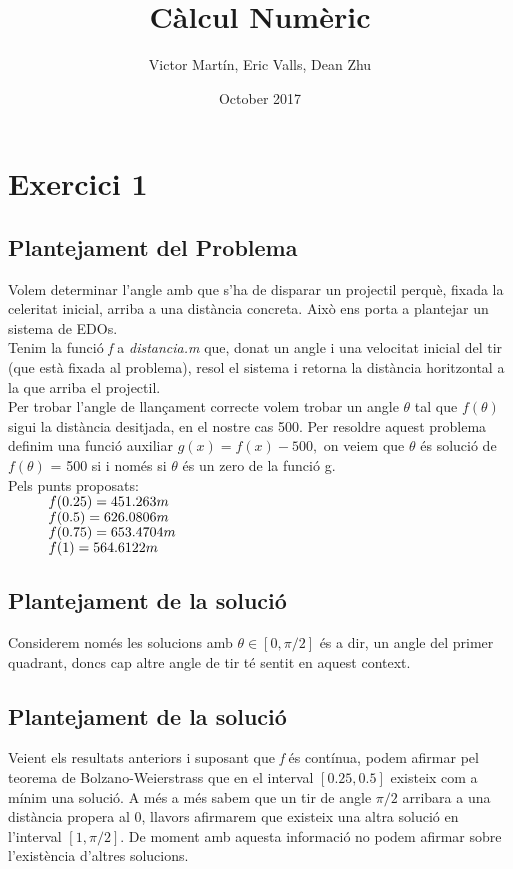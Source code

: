 \documentclass{article}
\title{C\`alcul Num\`eric}
\author{Victor Mart\'in, Eric Valls, Dean Zhu}
\date{October 2017}
\begin{document}
\maketitle
\section*{Exercici 1}
\subsection*{Plantejament del Problema}
\quad Volem determinar l'angle amb que s'ha de disparar un projectil perquè, fixada la celeritat inicial, arriba a una dist\`ancia concreta. Aix\`o ens porta a plantejar un sistema de EDOs. \\

Tenim la funci\'o \emph{f} a \emph{distancia.m}
que, donat un angle i una velocitat inicial del tir (que està fixada al problema), resol el sistema i retorna la dist\`ancia horitzontal a la que arriba el projectil. \\

Per trobar l'angle de llan\c{c}ament correcte volem trobar un angle ${\theta}$ tal que $f({\theta})$ sigui la dist\`ancia desitjada, en el nostre cas 500. Per resoldre aquest problema definim una funci\'o auxiliar $g(x) = f(x) - 500,$ on veiem que ${\theta}$ \'es soluci\'o de $f({\theta})$ = 500 si i només si  ${\theta}$  és un zero de la funci\'o g.\\

Pels punts proposats:\\
$\hspace*{1cm} f(0.25) = 451.263 m$\\
$\hspace*{1cm} f(0.5) = 626.0806 m$\\
$\hspace*{1cm} f(0.75) = 653.4704 m$\\
$\hspace*{1cm} f(1) = 564.6122 m$
\subsection*{Plantejament de la soluci\'o}
\quad Considerem nom\'es les solucions amb $\theta  \in [0,\pi/2]$ \'es a dir, un angle del primer quadrant, doncs cap altre angle de tir t\'e sentit en aquest context.\\

\subsection*{Plantejament de la soluci\'o}
Veient els resultats anteriors i suposant que \emph{f} \'es cont\'inua, podem afirmar pel teorema de Bolzano-Weierstrass que en el interval $[0.25,0.5]$ existeix com a m\'inim una soluci\'o.
A m\'es a m\'es sabem que un tir de angle $\pi/2$ arribara a una dist\`ancia propera al 0, llavors afirmarem que existeix una altra soluci\'o en l'interval $[1,\pi/2]$. De moment amb aquesta informaci\'o no podem afirmar sobre l'exist\`encia d'altres solucions.
\end{document}
